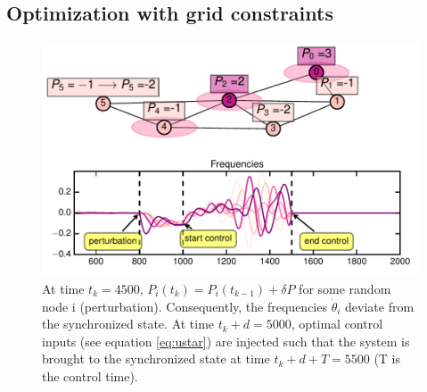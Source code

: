 \documentclass[conference]{IEEEtran}
\begin{document}
\subsection{Optimization with grid constraints}

\begin{figure}
\includegraphics[scale=.55]{plot5.pdf}%
\caption{At time $ t_k=4500 $, $P_i(t_k) = P_i(t_{k-1}) + \delta P$ for some random node i (perturbation). Consequently, the frequencies $ \dot{ \theta }_i $ deviate from the synchronized state. At time $ t_k + d = 5000$, optimal control inputs (see equation \ref{eq:ustar}) are injected such that the system is brought to the synchronized state at time $ t_k + d + T = 5500 $ (T is the control time).} 


\label{fig:frequecies}
\end{figure}
\end{document}
